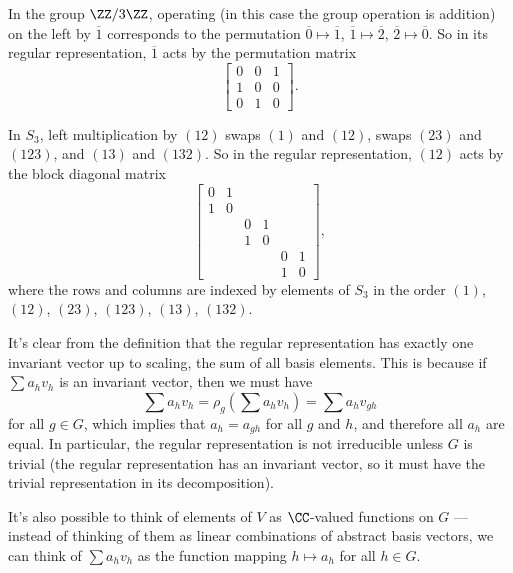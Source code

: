 \begin{example}
    In the group $\ZZ/3\ZZ$, operating (in this case the group operation is addition) on the left by $\overline{1}$ corresponds to the permutation $\overline{0} \mapsto \overline{1}$, $\overline{1} \mapsto \overline{2}$, $\overline{2} \mapsto \overline{0}$. So in its regular representation, $\overline{1}$ acts by the permutation matrix \[\begin{bmatrix} 0 & 0 & 1 \\ 1 & 0 & 0 \\ 0 & 1 & 0 \end{bmatrix}.\] 
\end{example}

\begin{example}
    In $S_3$, left multiplication by $(12)$ swaps $(1)$ and $(12)$, swaps $(23)$ and $(123)$, and $(13)$ and $(132)$. So in the regular representation, $(12)$ acts by the block diagonal matrix \[\begin{bmatrix} 0 & 1 & & & & \\ 1 & 0 & & & & \\ & & 0 & 1 & & \\ & & 1 & 0 & & \\ & & & & 0 & 1 \\ & & & & 1 & 0 \end{bmatrix},\] where the rows and columns are indexed by elements of $S_3$ in the order $(1)$, $(12)$, $(23)$, $(123)$, $(13)$, $(132)$.
\end{example}

It's clear from the definition that the regular representation has exactly one invariant vector up to scaling, the sum of all basis elements. This is because if $\sum a_hv_h$ is an invariant vector, then we must have \[\sum a_hv_h = \rho_g\left(\sum a_hv_h\right) = \sum a_hv_{gh}\] for all $g \in G$, which implies that $a_h = a_{gh}$ for all $g$ and $h$, and therefore all $a_h$ are equal. In particular, the regular representation is not irreducible unless $G$ is trivial (the regular representation has an invariant vector, so it must have the trivial representation in its decomposition). 

\begin{note}
It's also possible to think of elements of $V$ as $\CC$-valued functions on $G$ --- instead of thinking of them as linear combinations of abstract basis vectors, we can think of $\sum a_hv_h$ as the function mapping $h \mapsto a_h$ for all $h \in G$. 
\end{note}

